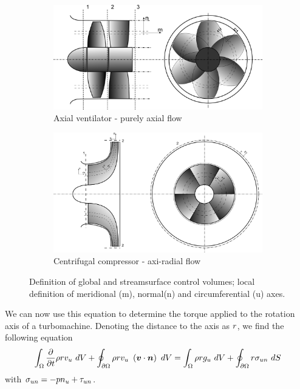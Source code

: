 \begin{figure}[!h]
  \begin{subfigure}{\textwidth}
    \includegraphics[width=\textwidth]{principles/ventilator_streamSurface.png}
    \caption{Axial ventilator - purely axial flow}
  \end{subfigure}
  \begin{subfigure}{\textwidth}
    \includegraphics[width=\textwidth]{principles/centrifugalCompressor.png}
    \caption{Centrifugal compressor - axi-radial flow}
  \end{subfigure}
  \caption{Definition of global and streamsurface control volumes;
    local definition of meridional (m), normal(n) and circumferential
    (u) axes.}
  \label{fig:turbomachineControlVolumes}
\end{figure}
We can now use this equation to determine the torque applied to the
rotation axis of a turbomachine. Denoting the distance to the axis as
$r$, we find the following equation
\begin{equation}
  \int_{\Omega} \frac{\partial }{\partial t} \rho r v_u ~dV + \oint_{{\partial \Omega}} \rho r v_u ~
  \left(\boldsymbol {v} \cdot \boldsymbol {n}\right)~dV = \int_{\Omega} \rho r g_u~dV +
  \oint_{{\partial \Omega}} r \sigma_{un} ~dS
  \label{eq:momentOfMomentumAxis}
\end{equation}
with $\sigma_{un} = - p n_u + \tau_{un}$.

